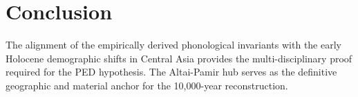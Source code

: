 \section{Conclusion}
The alignment of the empirically derived phonological invariants with the early Holocene demographic shifts in Central Asia provides the multi-disciplinary proof required for the PED hypothesis. The Altai-Pamir hub serves as the definitive geographic and material anchor for the 10,000-year reconstruction.

